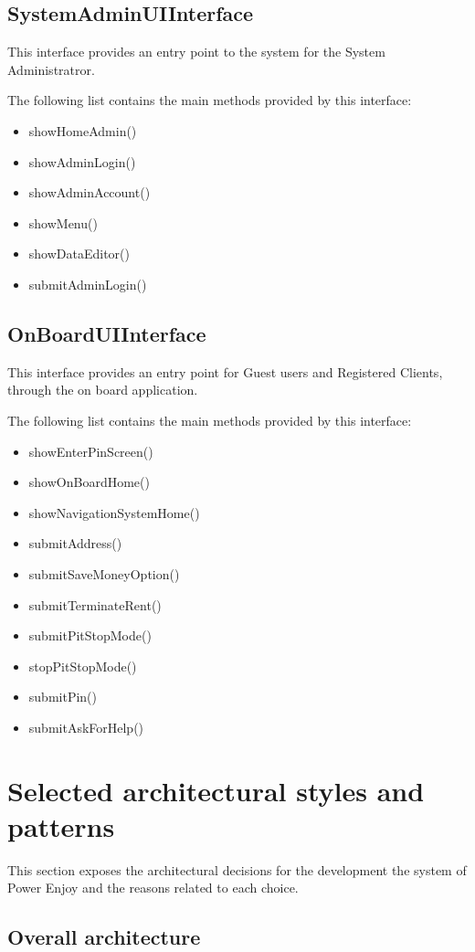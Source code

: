 \subsection{SystemAdminUIInterface}
This interface provides an entry point to the system for the System Administratror.

The following list contains the main methods provided by this interface:

\begin{itemize}
\item showHomeAdmin()
\item showAdminLogin()
\item showAdminAccount()
\item showMenu()
\item showDataEditor()
\item submitAdminLogin()
\end{itemize}

\subsection{OnBoardUIInterface}
This interface provides an entry point for Guest users and Registered Clients, through the on board application.

The following list contains the main methods provided by this interface:
\begin{itemize}
\item showEnterPinScreen()
\item showOnBoardHome()
\item showNavigationSystemHome()
\item submitAddress()
\item submitSaveMoneyOption()
\item submitTerminateRent()
\item submitPitStopMode()
\item stopPitStopMode()
\item submitPin()
\item submitAskForHelp()
\end{itemize}

\section{Selected architectural styles and patterns}
This section exposes the architectural decisions for the development the system of Power Enjoy and the reasons related to each choice.

\subsection{Overall architecture}
